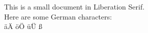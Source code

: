 \documentclass{article}
\begin{document}
This is a small document in Liberation Serif.
\\
Here are some German characters:
\\
äÄ öÖ üÜ ß
\end{document}
